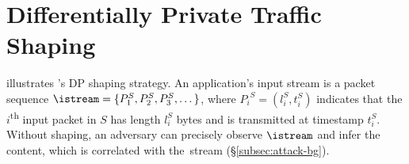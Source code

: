 \section{Differentially Private Traffic Shaping}
\label{sec:dp}

 illustrates {\sys}'s DP shaping strategy.
An application's input stream is a packet sequence
$\istream = \{{P^S_1}, {P^S_2}, {P^S_3}, \dots \}$,
where ${P_i}^S = (l^S_i, t^S_i)$ indicates that the $i$\textsuperscript{th} input
packet in $S$ has length $l^S_i$ bytes and is transmitted at timestamp $t^S_i$.
Without shaping, an adversary can precisely observe $\istream$ and infer
the content,
which is correlated with the~stream (\S\ref{subsec:attack-bg}). %

